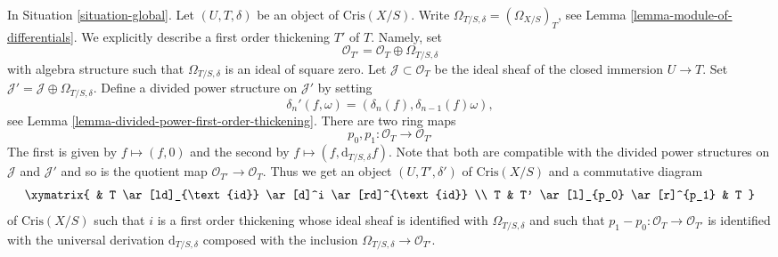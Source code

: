 \begin{remark}
\label{remark-first-order-thickening}
In Situation \ref{situation-global}.
Let $(U, T, \delta)$ be an object of $\text{Cris}(X/S)$.
Write $\Omega_{T/S, \delta} = (\Omega_{X/S})_T$, see
Lemma \ref{lemma-module-of-differentials}.
We explicitly describe a first order thickening $T'$ of
$T$. Namely, set
$$
\mathcal{O}_{T'} = \mathcal{O}_T \oplus \Omega_{T/S, \delta}
$$
with algebra structure such that $\Omega_{T/S, \delta}$ is an
ideal of square zero. Let $\mathcal{J} \subset \mathcal{O}_T$
be the ideal sheaf of the closed immersion $U \to T$. Set
$\mathcal{J}' = \mathcal{J} \oplus \Omega_{T/S, \delta}$.
Define a divided power structure on $\mathcal{J}'$ by setting
$$
\delta_n'(f, \omega) = (\delta_n(f), \delta_{n - 1}(f)\omega),
$$
see Lemma \ref{lemma-divided-power-first-order-thickening}.
There are two ring maps
$$
p_0, p_1 : \mathcal{O}_T \to \mathcal{O}_{T'}
$$
The first is given by $f \mapsto (f, 0)$ and the second by
$f \mapsto (f, \text{d}_{T/S, \delta}f)$. Note that both are compatible
with the divided power structures on $\mathcal{J}$ and $\mathcal{J}'$
and so is the quotient map $\mathcal{O}_{T'} \to \mathcal{O}_T$.
Thus we get an object $(U, T', \delta')$ of $\text{Cris}(X/S)$
and a commutative diagram
$$
\xymatrix{
& T \ar[ld]_{\text{id}} \ar[d]^i \ar[rd]^{\text{id}} \\
T & T' \ar[l]_{p_0} \ar[r]^{p_1} & T
}
$$
of $\text{Cris}(X/S)$ such that $i$ is a first order thickening whose ideal
sheaf is identified with $\Omega_{T/S, \delta}$ and such that
$p_1 - p_0 : \mathcal{O}_T \to \mathcal{O}_{T'}$
is identified with the universal derivation $\text{d}_{T/S, \delta}$
composed with the inclusion $\Omega_{T/S, \delta} \to \mathcal{O}_{T'}$.
\end{remark}

